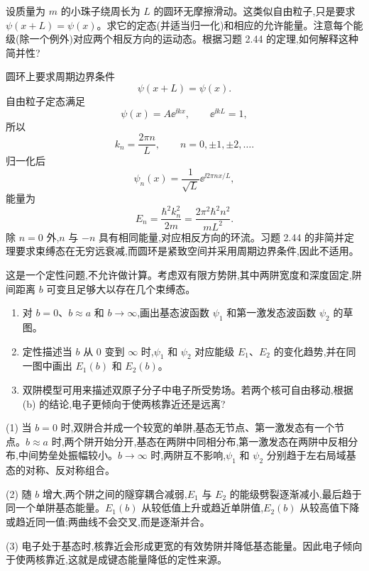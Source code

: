 \begin{question}
设质量为 $m$ 的小珠子绕周长为 $L$ 的圆环无摩擦滑动。这类似自由粒子,只是要求 $\psi(x+L)=\psi(x)$。求它的定态(并适当归一化)和相应的允许能量。注意每个能级(除一个例外)对应两个相反方向的运动态。根据习题 2.44 的定理,如何解释这种简并性?
\end{question}
\begin{solution}
圆环上要求周期边界条件
\[
\psi(x+L)=\psi(x).
\]
自由粒子定态满足
\[
\psi(x)=A\ee^{\ii kx},
\qquad \ee^{\ii kL}=1,
\]
所以
\[
k_n=\frac{2\pi n}{L},
\qquad n=0,\pm1,\pm2,\ldots.
\]
归一化后
\[
\psi_n(x)=\frac1{\sqrt L}\ee^{\ii2\pi nx/L},
\]
能量为
\[
E_n=\frac{\hbar^2k_n^2}{2m}
=\frac{2\pi^2\hbar^2n^2}{mL^2}.
\]
除 $n=0$ 外,$n$ 与 $-n$ 具有相同能量,对应相反方向的环流。习题 2.44 的非简并定理要求束缚态在无穷远衰减,而圆环是紧致空间并采用周期边界条件,因此不适用。
\end{solution}

\begin{question}
这是一个定性问题,不允许做计算。考虑双有限方势阱,其中两阱宽度和深度固定,阱间距离 $b$ 可变且足够大以存在几个束缚态。
\begin{enumerate}
\item 对 $b=0$、$b\approx a$ 和 $b\to\infty$,画出基态波函数 $\psi_1$ 和第一激发态波函数 $\psi_2$ 的草图。
\item 定性描述当 $b$ 从 $0$ 变到 $\infty$ 时,$\psi_1$ 和 $\psi_2$ 对应能级 $E_1$、$E_2$ 的变化趋势,并在同一图中画出 $E_1(b)$ 和 $E_2(b)$。
\item 双阱模型可用来描述双原子分子中电子所受势场。若两个核可自由移动,根据 (b) 的结论,电子更倾向于使两核靠近还是远离?
\end{enumerate}
\end{question}
\begin{solution}
(1) 当 $b=0$ 时,双阱合并成一个较宽的单阱,基态无节点、第一激发态有一个节点。$b\approx a$ 时,两个阱开始分开,基态在两阱中同相分布,第一激发态在两阱中反相分布,中间势垒处振幅较小。$b\to\infty$ 时,两阱互不影响,$\psi_1$ 和 $\psi_2$ 分别趋于左右局域基态的对称、反对称组合。

(2) 随 $b$ 增大,两个阱之间的隧穿耦合减弱,$E_1$ 与 $E_2$ 的能级劈裂逐渐减小,最后趋于同一个单阱基态能量。$E_1(b)$ 从较低值上升或趋近单阱值,$E_2(b)$ 从较高值下降或趋近同一值;两曲线不会交叉,而是逐渐并合。

(3) 电子处于基态时,核靠近会形成更宽的有效势阱并降低基态能量。因此电子倾向于使两核靠近,这就是成键态能量降低的定性来源。
\end{solution}

